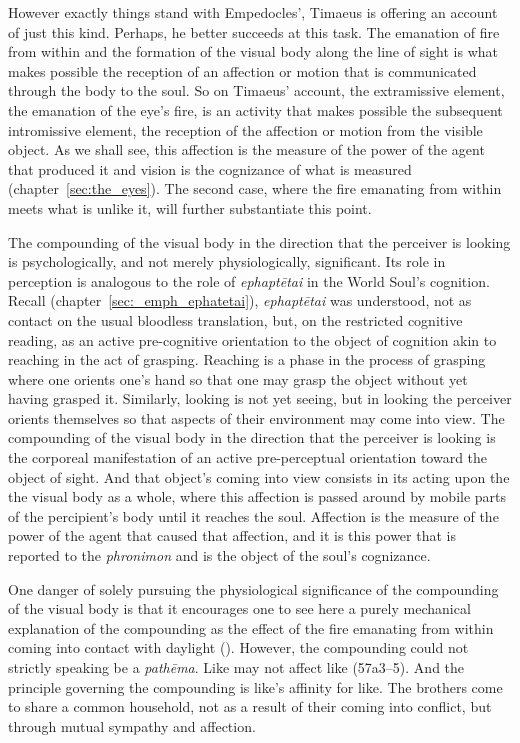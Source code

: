 However exactly things stand with Empedocles', Timaeus is offering an account of just this kind. Perhaps, he better succeeds at this task. The emanation of fire from within and the formation of the visual body along the line of sight is what makes possible the reception of an affection or motion that is communicated through the body to the soul. So on Timaeus' account, the extramissive element, the emanation of the eye's fire, is an activity that makes possible the subsequent intromissive element, the reception of the affection or motion from the visible object. As we shall see, this affection is the measure of the power of the agent that produced it and vision is the cognizance of what is measured (chapter~\ref{sec:the_eyes}). The second case, where the fire emanating from within meets what is unlike it, will further substantiate this point.

The compounding of the visual body in the direction that the perceiver is looking is psychologically, and not merely physiologically, significant. Its role in perception is analogous to the role of \emph{ephaptētai} in the World Soul's cognition. Recall (chapter~\ref{sec:_emph_ephatetai}), \emph{ephaptētai} was understood, not as contact on the usual bloodless translation, but, on the restricted cognitive reading, as an active pre-cognitive orientation to the object of cognition akin to reaching in the act of grasping. Reaching is a phase in the process of grasping where one orients one's hand so that one may grasp the object without yet having grasped it. Similarly, looking is not yet seeing, but in looking the perceiver orients themselves so that aspects of their environment may come into view. The compounding of the visual body in the direction that the perceiver is looking is the corporeal manifestation of an active pre-perceptual orientation toward the object of sight. And that object's coming into view consists in its acting upon the the visual body as a whole, where this affection is passed around by mobile parts of the percipient's body until it reaches the soul. Affection is the measure of the power of the agent that caused that affection, and it is this power that is reported to the \emph{phronimon} and is the object of the soul's cognizance.

One danger of solely pursuing the physiological significance of the compounding of the visual body is that it encourages one to see here a purely mechanical explanation of the compounding as the effect of the fire emanating from within coming into contact with daylight (\citealt[130-1]{Betegh:2019fq}). However, the compounding could not strictly speaking be a \emph{pathēma}. Like may not affect like (57a3–5). And the principle governing the compounding is like's affinity for like. The brothers come to share a common household, not as a result of their coming into conflict, but through mutual sympathy and affection.


